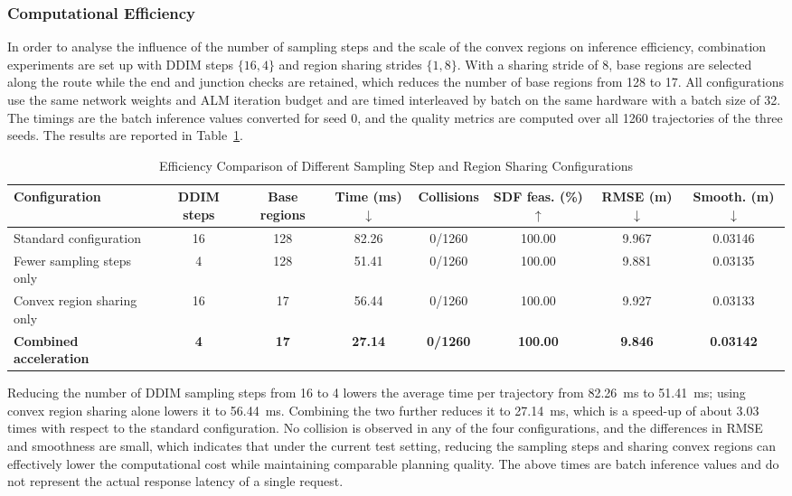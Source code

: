\documentclass[journal]{IEEEtran}
\begin{document}
\subsubsection{Computational Efficiency}

In order to analyse the influence of the number of sampling steps and the scale of the convex regions on inference efficiency, combination experiments are set up with DDIM steps $\{16,4\}$ and region sharing strides $\{1,8\}$. With a sharing stride of 8, base regions are selected along the route while the end and junction checks are retained, which reduces the number of base regions from 128 to 17. All configurations use the same network weights and ALM iteration budget and are timed interleaved by batch on the same hardware with a batch size of 32. The timings are the batch inference values converted for seed 0, and the quality metrics are computed over all 1260 trajectories of the three seeds. The results are reported in Table~\ref{tab:efficiency}.

\begin{table}[!t]
\centering
\caption{Efficiency Comparison of Different Sampling Step and Region Sharing Configurations}
\label{tab:efficiency}
\footnotesize
\setlength{\tabcolsep}{5pt}
\begin{tabular}{lccccccc}
\toprule
Configuration & DDIM steps & Base regions & Time (ms) $\downarrow$ & Collisions & SDF feas. (\%) $\uparrow$ & RMSE (m) $\downarrow$ & Smooth. (m) $\downarrow$\\
\midrule
Standard configuration       & 16 & 128 & 82.26 & 0/1260 & 100.00 & 9.967 & 0.03146\\
Fewer sampling steps only    &  4 & 128 & 51.41 & 0/1260 & 100.00 & 9.881 & 0.03135\\
Convex region sharing only   & 16 &  17 & 56.44 & 0/1260 & 100.00 & 9.927 & 0.03133\\[2pt]
\textbf{Combined acceleration} & \textbf{4} & \textbf{17} & \textbf{27.14} & \textbf{0/1260} & \textbf{100.00} & \textbf{9.846} & \textbf{0.03142}\\
\bottomrule
\end{tabular}
\end{table}

Reducing the number of DDIM sampling steps from 16 to 4 lowers the average time per trajectory from 82.26~ms to 51.41~ms; using convex region sharing alone lowers it to 56.44~ms. Combining the two further reduces it to 27.14~ms, which is a speed-up of about 3.03 times with respect to the standard configuration. No collision is observed in any of the four configurations, and the differences in RMSE and smoothness are small, which indicates that under the current test setting, reducing the sampling steps and sharing convex regions can effectively lower the computational cost while maintaining comparable planning quality. The above times are batch inference values and do not represent the actual response latency of a single request.
\end{document}
